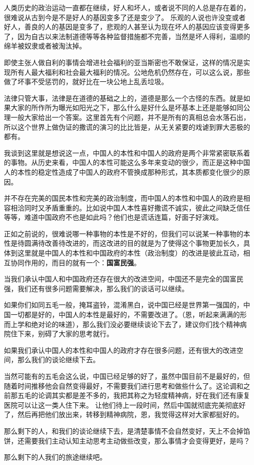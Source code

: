 \documentclass[12pt,oneside]{book}
\begin{document}
\begin{common-format}
人类历史的政治运动一直都在继续，好人和坏人，或者说不同的人总是存在着的，很难说从古到今是不是好人的基因变多了还是变少了。 乐观的人说也许没变或者好人，善良的人的基因是变多了，悲观的人甚至认为现在坏人的基因应该变得更多了，因为自古以来法制道德等等各种监督措施都不完善，当然是坏人得利，温顺的绵羊被奴隶或者被淘汰掉。

即使主张人做自利的事情会增进社会福利的亚当斯密也不敢保证，这样的情况是实现所有人最大福利和社会最大福利的情况。公地危机仍然存在，可以这么说，那些做了坏事不受惩罚的，就好比在一块公地上乱丢垃圾。

法律只管大事，法律是在道德的基础之上的，道德是那么一个古怪的东西。就是如果大家的所作所为曝光如阳光之下，那么什么是好什么是坏基本上还是能够如同公理一般大家给出一个答案。这里首先有个问题，并不是所有的真相总会水落石出，所以这个世界上做伪证的撒谎的演习的比比皆是，从无关紧要的戏谑到罪大恶极的都有。

我谈到这里就是想说这一点，中国人的本性和中国人的政府是两个非常紧密联系着的事物。从历史来看，中国人的本性可能这么多年来变动的很少，而正是这种中国人的本性的稳定性造成了中国人的政府不管换成那种形式，其本质都变化很少的原因。

并不存在完美的国民本性和完美的政治制度，而中国人的本性和中国人的政府是相容相洽同时又矛盾重重的。比如说中国人本性喜好撒谎不诚实，彼此之间缺乏信任等等，难道中国政府不也是如此吗？他们也是谎话连篇，好面子好演戏。

正如之前说的，很难说哪一种事物的本性是不好的，但我们可以说某一种事物的本性是待圆满待改善待改进的，而这改进的目的就是为了使得这个事物更加长久，具体到这里就是中国人的本性和中国政府的本性（政治制度）的改进是彼此互动，相互协同作用的，而目的就有一个：\textbf{国富民强}。﻿

当我们承认中国人和中国政府还存在很大的改进空间，中国还不是完全的国富民强，我们还有很多问题需要解决，那么我们的谈话可以继续。

如果你们如同五毛一般，掩耳盗铃，混淆黑白，说中国已经是世界第一强国的，中国一切都是好的，中国人的本性是最好的，不需要改进了。（恩，听起来满满的形而上学和绝对论的味道），那么我们没必要继续谈论下去了，建议你们找个精神病院住下来，别碍了大家的思考就行。

如果我们承认中国人的本性和中国人的政府才存在很多问题，还有很大的改进空间，那么我们的谈论继续下去。

当然可能有的五毛会这么说，中国已经足够的好了，虽然中国目前不是最好的，但随着时间推移他会自然变得最好，不需要我们进行思考和做些什么了。这论调和之前那五毛的论调其实都是差不多的，我把其称之为轻度精神病，好在我们还有康复医院可以让这一类人住下来。 让他们待上一段时间，然后中国就彻底完美彻底好了，然后再把他们放出来，转移到精神病院，恩，我觉得这样对大家都挺好的。

那么剩下的人，和我们的谈论继续下去，是清楚事情不会自然变好，天上不会掉馅饼，还需要我们主动认知主动思考主动做些改变，那么事情才会变得更好，是吗？

那么剩下的人我们的旅途继续吧。﻿

\end{common-format}
\end{document}

